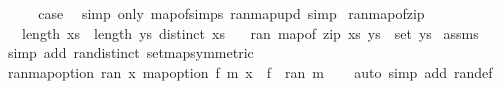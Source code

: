 \begin{isabellebody}
\ \ \isamarkupfalse%
\ \isamarkupfalse%
\ {\isacharquery}{\kern0pt}case\ \isamarkupfalse%
\ {\isacharparenleft}{\kern0pt}simp\ only{\isacharcolon}{\kern0pt}\ map{\isacharunderscore}{\kern0pt}of{\isachardot}{\kern0pt}simps\ ran{\isacharunderscore}{\kern0pt}map{\isacharunderscore}{\kern0pt}upd{\isacharparenright}{\kern0pt}\ simp\isanewline
{}\isamarkupfalse%
%
\endisatagproof
{\isafoldproof}%
%
\isadelimproof
\isanewline
%
\endisadelimproof
\isanewline
{}\isamarkupfalse%
\ ran{\isacharunderscore}{\kern0pt}map{\isacharunderscore}{\kern0pt}of{\isacharunderscore}{\kern0pt}zip{\isacharcolon}{\kern0pt}\isanewline
\ \ \ {\isachardoublequoteopen}length\ xs\ {\isacharequal}{\kern0pt}\ length\ ys{\isachardoublequoteclose}\ {\isachardoublequoteopen}distinct\ xs{\isachardoublequoteclose}\isanewline
\ \ \ {\isachardoublequoteopen}ran\ {\isacharparenleft}{\kern0pt}map{\isacharunderscore}{\kern0pt}of\ {\isacharparenleft}{\kern0pt}zip\ xs\ ys{\isacharparenright}{\kern0pt}{\isacharparenright}{\kern0pt}\ {\isacharequal}{\kern0pt}\ set\ ys{\isachardoublequoteclose}\isanewline
%
\isadelimproof
%
\endisadelimproof
%
\isatagproof
{}\isamarkupfalse%
\ assms\ \isamarkupfalse%
\ {\isacharparenleft}{\kern0pt}simp\ add{\isacharcolon}{\kern0pt}\ ran{\isacharunderscore}{\kern0pt}distinct\ set{\isacharunderscore}{\kern0pt}map{\isacharbrackleft}{\kern0pt}symmetric{\isacharbrackright}{\kern0pt}{\isacharparenright}{\kern0pt}%
\endisatagproof
{\isafoldproof}%
%
\isadelimproof
\isanewline
%
\endisadelimproof
\isanewline
{}\isamarkupfalse%
\ ran{\isacharunderscore}{\kern0pt}map{\isacharunderscore}{\kern0pt}option{\isacharcolon}{\kern0pt}\ {\isachardoublequoteopen}ran\ {\isacharparenleft}{\kern0pt}{\isasymlambda}x{\isachardot}{\kern0pt}\ map{\isacharunderscore}{\kern0pt}option\ f\ {\isacharparenleft}{\kern0pt}m\ x{\isacharparenright}{\kern0pt}{\isacharparenright}{\kern0pt}\ {\isacharequal}{\kern0pt}\ f\ {\isacharbackquote}{\kern0pt}\ ran\ m{\isachardoublequoteclose}\isanewline
%
\isadelimproof
\ \ %
\endisadelimproof
%
\isatagproof
{}\isamarkupfalse%
\ {\isacharparenleft}{\kern0pt}auto\ simp\ add{\isacharcolon}{\kern0pt}\ ran{\isacharunderscore}{\kern0pt}def{\isacharparenright}{\kern0pt}%
\endisatagproof
{\isafoldproof}%
%
\isadelimproof
%
\endisadelimproof
%
\isadelimdocument
%
\endisadelimdocument
%
\isatagdocument
%
\isamarkuptrue%
%
\endisatagdocument
{\isafolddocument}%
%

\end{isabellebody}
